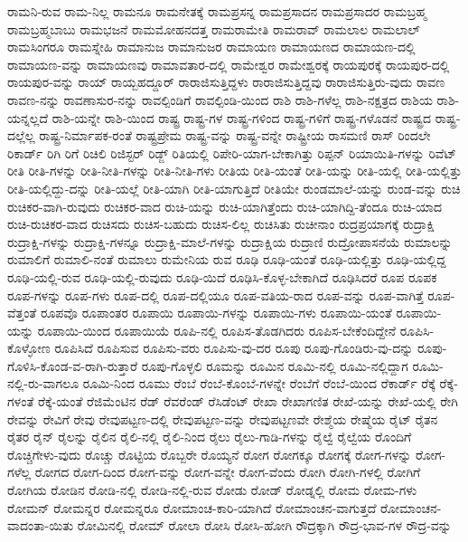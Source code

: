{ರಾಮನಿ-ರುವ
ರಾಮ-ನಿಲ್ಲ
ರಾಮನೂ
ರಾಮನೇತಕ್ಕೆ
ರಾಮಪ್ರಸನ್ನ
ರಾಮಪ್ರಸಾದನ
ರಾಮಪ್ರಸಾದರ
ರಾಮಬ್ರಹ್ಮ
ರಾಮಬ್ರಹ್ಮಬಾಬು
ರಾಮಭಜನೆ
ರಾಮಮೋಹನದತ್ತ
ರಾಮರಾಮೇತಿ
ರಾಮರಾವ್
ರಾಮಲಾಲ
ರಾಮಲಾಲ್
ರಾಮಸಿಂಗರೂ
ರಾಮಸ್ನೇಹಿ
ರಾಮಾನುಜ
ರಾಮಾನುಜರ
ರಾಮಾಯಣ
ರಾಮಾಯಣದ
ರಾಮಾಯಣ-ದಲ್ಲಿ
ರಾಮಾಯಣ-ವನ್ನು
ರಾಮಾಯಣವು
ರಾಮಾವತಾರ-ದಲ್ಲಿ
ರಾಮೇಶ್ವರ
ರಾಮೇಶ್ವರಕ್ಕೆ
ರಾಯಪುರಕ್ಕೆ
ರಾಯಪುರ-ದಲ್ಲಿ
ರಾಯಪುರ-ವನ್ನು
ರಾಯ್
ರಾಯ್ಬಹದ್ದೂರ್
ರಾರಾಜಿಸುತ್ತಿದ್ದಳು
ರಾರಾಜಿಸುತ್ತಿದ್ದವು
ರಾರಾಜಿಸುತ್ತಿರು-ವುದು
ರಾವಣ
ರಾವಣ-ನನ್ನು
ರಾವಣಾಸುರ-ನನ್ನು
ರಾವಲ್ಪಿಂಡಿಗೆ
ರಾವಲ್ಪಿಂಡಿ-ಯಿಂದ
ರಾಶಿ
ರಾಶಿ-ಗಳೆಲ್ಲ
ರಾಶಿ-ನಕ್ಷತ್ರದ
ರಾಶಿಯ
ರಾಶಿ-ಯನ್ನಲ್ಲದೆ
ರಾಶಿ-ಯನ್ನೇ
ರಾಶಿ-ಯಿಂದ
ರಾಷ್ಟ್ರ
ರಾಷ್ಟ್ರ-ಗಳ
ರಾಷ್ಟ್ರ-ಗಳಿಂದ
ರಾಷ್ಟ್ರ-ಗಳಿಗೆ
ರಾಷ್ಟ್ರ-ಗಳೊಡನೆ
ರಾಷ್ಟ್ರದ
ರಾಷ್ಟ್ರ-ದಲ್ಲೆಲ್ಲ
ರಾಷ್ಟ್ರ-ನಿರ್ಮಾಪಕ-ರಂತೆ
ರಾಷ್ಟ್ರಪ್ರೇಮ
ರಾಷ್ಟ್ರ-ವನ್ನು
ರಾಷ್ಟ್ರ-ವನ್ನೇ
ರಾಷ್ಟ್ರೀಯ
ರಾಸಮಣಿ
ರಾಸ್
ರಿಂದಲೇ
ರಿಕಾರ್ಡ್
ರಿಗಿ
ರಿಗೆ
ರಿಚಿಲಿ
ರಿಜಿಸ್ಟರ್
ರಿಡ್ಜ್
ರಿತಿಯಲ್ಲಿ
ರಿಪೇರಿ-ಯಾಗ-ಬೇಕಾಗಿತ್ತು
ರಿಪ್ಪನ್
ರಿಯಾಯಿತಿ-ಗಳನ್ನು
ರಿವೆಟ್
ರೀತಿ
ರೀತಿ-ಗಳನ್ನು
ರೀತಿ-ನೀತಿ-ಗಳನ್ನು
ರೀತಿ-ನೀತಿ-ಗಳು
ರೀತಿಯ
ರೀತಿ-ಯಂತೆ
ರೀತಿ-ಯನ್ನು
ರೀತಿ-ಯಲ್ಲಿ
ರೀತಿ-ಯಲ್ಲಿತ್ತು
ರೀತಿ-ಯಲ್ಲಿದ್ದು-ದನ್ನು
ರೀತಿ-ಯಲ್ಲೆ
ರೀತಿ-ಯಾಗಿ
ರೀತಿ-ಯಾಗುತ್ತಿದೆ
ರೀತಿಯೇ
ರುಂಡಮಾಲೆ-ಯನ್ನು
ರುಂಡ-ವನ್ನು
ರುಚಿ
ರುಚಿಕರ-ವಾಗಿ-ರುವುದು
ರುಚಿಕರ-ವಾದ
ರುಚಿ-ಯನ್ನು
ರುಚಿ-ಯಾಗಿತ್ತೆಂದು
ರುಚಿ-ಯಾಗಿದ್ದಿ-ತೆಂದೂ
ರುಚಿ-ಯಾದ
ರುಚಿ-ರುಚಿಕರ-ವಾದ
ರುಚಿಸದು
ರುಚಿಸ-ಬಹುದು
ರುಚಿಸ-ಲಿಲ್ಲ
ರುಚಿಸಿತು
ರುಚೀನಾಂ
ರುದ್ರಪ್ರಯಾಗಕ್ಕೆ
ರುದ್ರಾಕ್ಷಿ
ರುದ್ರಾಕ್ಷಿ-ಗಳನ್ನು
ರುದ್ರಾಕ್ಷಿ-ಗಳನ್ನೂ
ರುದ್ರಾಕ್ಷಿ-ಮಾಲೆ-ಗಳನ್ನು
ರುದ್ರಾಕ್ಷಿಯ
ರುದ್ರಾಣಿ
ರುದ್ರೋಪಾಸನೆಯೆ
ರುಮಾಲನ್ನು
ರುಮಾಲಿಗೆ
ರುಮಾಲಿ-ನಂತೆ
ರುಮಾಲು
ರುಮೇನಿಯ
ರುವ
ರೂಢಿ
ರೂಢಿ-ಯಂತೆ
ರೂಢಿ-ಯಲ್ಲಿತ್ತು
ರೂಢಿ-ಯಲ್ಲಿದ್ದ
ರೂಢಿ-ಯಲ್ಲಿ-ರುವ
ರೂಢಿ-ಯಲ್ಲಿ-ರುವುದು
ರೂಢಿ-ಯಿದೆ
ರೂಢಿಸಿ-ಕೊಳ್ಳ-ಬೇಕಾಗಿದೆ
ರೂಢಿಸಿದರೆ
ರೂಪ
ರೂಪಕ
ರೂಪ-ಗಳನ್ನು
ರೂಪ-ಗಳು
ರೂಪ-ದಲ್ಲಿ
ರೂಪ-ದಲ್ಲಿಯೂ
ರೂಪ-ವತಿಯ-ರಾದ
ರೂಪ-ವನ್ನು
ರೂಪ-ವಾಗಿತ್ತೆ
ರೂಪ-ವೆತ್ತಂತೆ
ರೂಪವೊ
ರೂಪಾಂತರ
ರೂಪಾಯಿ
ರೂಪಾಯಿ-ಗಳನ್ನು
ರೂಪಾಯಿ-ಗಳು
ರೂಪಾಯಿ-ಯಂತೆ
ರೂಪಾಯಿ-ಯನ್ನು
ರೂಪಾಯಿ-ಯಿಂದ
ರೂಪಾಯಿಯೆ
ರೂಪಿ-ನಲ್ಲಿ
ರೂಪಿಸ-ತೊಡಗಿದರು
ರೂಪಿಸ-ಬೇಕೆಂದಿದ್ದೇನೆ
ರೂಪಿಸಿ-ಕೊಳ್ಳೋಣ
ರೂಪಿಸಿದೆ
ರೂಪಿಸುವ
ರೂಪಿಸು-ವರು
ರೂಪಿಸು-ವು-ದರ
ರೂಪು
ರೂಪು-ಗೊಂಡಿರು-ವು-ದನ್ನು
ರೂಪು-ಗೊಳಿಸಿ-ಕೊಂಡ-ವ-ರಾಗಿ-ರುತ್ತಾರೆ
ರೂಪು-ಗೊಳ್ಳಲಿ
ರೂಮನ್ನು
ರೂಮಿನ
ರೂಮಿ-ನಲ್ಲಿ
ರೂಮಿ-ನಲ್ಲಿದ್ದಾಗ
ರೂಮಿ-ನಲ್ಲಿ-ರು-ವಾಗಲೂ
ರೂಮಿ-ನಿಂದ
ರೂಮು
ರೆಂಬೆ
ರೆಂಬೆ-ಕೊಂಬೆ-ಗಳನ್ನೇ
ರೆಂಬೆಗೆ
ರೆಂಬೆ-ಯಿಂದ
ರೆಕಾರ್ಡ್
ರೆಕ್ಕೆ
ರೆಕ್ಕೆ-ಗಳಂತೆ
ರೆಕ್ಕೆ-ಯಂತೆ
ರೆಜಿಮೆಂಟಿನ
ರೆಡ್
ರೆವರೆಂಡ್
ರೆಸಿಡೆಂಟ್
ರೇಖಾ
ರೇಖಾಗಣಿತ
ರೇಖೆ-ಯನ್ನು
ರೇಖೆ-ಯಲ್ಲಿ
ರೇಗಿ
ರೇವನ್ನು
ರೇವಿಗೆ
ರೇವು
ರೇವುಪಟ್ಟಣ-ದಲ್ಲಿ
ರೇವುಪಟ್ಟಣ-ವನ್ನು
ರೇವುಪಟ್ಟಣವೇ
ರೇಶ್ಮೆಯ
ರೇಷ್ಮೆಯ
ರೈಟ್
ರೈತನ
ರೈತರ
ರೈನ್
ರೈಲನ್ನು
ರೈಲಿನ
ರೈಲಿ-ನಲ್ಲಿ
ರೈಲಿ-ನಿಂದ
ರೈಲು
ರೈಲು-ಗಾಡಿ-ಗಳನ್ನು
ರೈಲ್ವೆ
ರೈಲ್ವೆಯ
ರೊಂದಿಗೆ
ರೊಚ್ಚಿಗೇಳು-ವುದು
ರೊಚ್ಚು
ರೊಟ್ಟಿಯ
ರೊಬ್ಬರೇ
ರೊಯ್ಯನೆ
ರೋಗ
ರೋಗಕ್ಕೂ
ರೋಗಕ್ಕೆ
ರೋಗ-ಗಳನ್ನು
ರೋಗ-ಗಳೆಲ್ಲ
ರೋಗದ
ರೋಗ-ದಿಂದ
ರೋಗ-ವನ್ನು
ರೋಗ-ವನ್ನೇ
ರೋಗ-ವೆಂದು
ರೋಗಿ
ರೋಗಿ-ಗಳಲ್ಲಿ
ರೋಗಿಗೆ
ರೋಗಿಯ
ರೋಡಿನ
ರೋಡಿ-ನಲ್ಲಿ
ರೋಡಿ-ನಲ್ಲಿ-ರುವ
ರೋಡು
ರೋಡ್
ರೋಡ್ನಲ್ಲಿ
ರೋಮ
ರೋಮ-ಗಳು
ರೋಮನ್
ರೋಮನ್ನರ
ರೋಮನ್ನರೂ
ರೋಮಾಂಚ-ಕಾರಿ-ಯಾಗಿದೆ
ರೋಮಾಂಚನ-ವಾಗುತ್ತದೆ
ರೋಮಾಂಚನ-ವಾದಂತಾ-ಯಿತು
ರೋಮಿನಲ್ಲಿ
ರೋಮ್
ರೋಲಾ
ರೋಸಿ
ರೋಸಿ-ಹೋಗಿ
ರೌದ್ರಕ್ಕಾಗಿ
ರೌದ್ರ-ಭಾವ-ಗಳ
ರೌದ್ರ-ವನ್ನು
}
